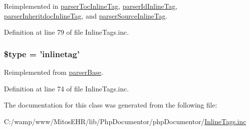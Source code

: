\-Reimplemented in \hyperlink{classparser_toc_inline_tag_a7583c1b3912b7afa3f038eb353a6ad97}{parser\-Toc\-Inline\-Tag}, \hyperlink{classparser_id_inline_tag_a7583c1b3912b7afa3f038eb353a6ad97}{parser\-Id\-Inline\-Tag}, \hyperlink{classparser_inheritdoc_inline_tag_a7583c1b3912b7afa3f038eb353a6ad97}{parser\-Inheritdoc\-Inline\-Tag}, and \hyperlink{classparser_source_inline_tag_a7583c1b3912b7afa3f038eb353a6ad97}{parser\-Source\-Inline\-Tag}.



\-Definition at line 79 of file \-Inline\-Tags.\-inc.

\hypertarget{classparser_inline_tag_a9a4a6fba2208984cabb3afacadf33919}{
\subsubsection[{\$type}]{\setlength{\rightskip}{0pt plus 5cm}\$type = 'inlinetag'}}\label{classparser_inline_tag_a9a4a6fba2208984cabb3afacadf33919}


\-Reimplemented from \hyperlink{classparser_base_a9a4a6fba2208984cabb3afacadf33919}{parser\-Base}.



\-Definition at line 74 of file \-Inline\-Tags.\-inc.



\-The documentation for this class was generated from the following file\-:\begin{DoxyCompactItemize}
\item 
\-C\-:/wamp/www/\-Mitos\-E\-H\-R/lib/\-Php\-Documentor/php\-Documentor/\hyperlink{_inline_tags_8inc}{\-Inline\-Tags.\-inc}\end{DoxyCompactItemize}
